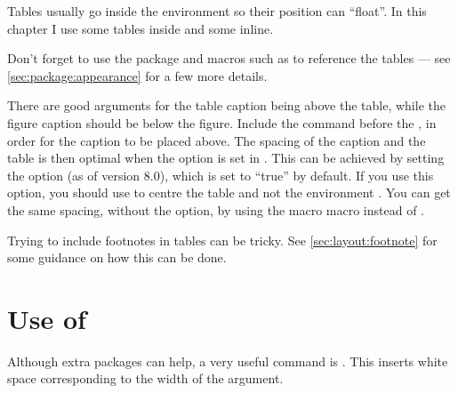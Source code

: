 Tables usually go inside the  environment so their position can \enquote{float}.
In this chapter I use some tables inside  and some inline.

Don't forget to use the package  and macros such as 
to reference the tables --- see \cref{sec:package:appearance} for a few more details.

There are good arguments for the table caption being above the table,
while the figure caption should be below the figure.
Include the  command before the ,
in order for the caption to be placed above.
The spacing of the caption and the table is then optimal
when the option 
is set in \KOMAScript.
This can be achieved by setting the option  (as of version 8.0), which is set to \enquote{true} by default.
If you use this option, you should use  to centre the table
and not the environment .
You can get the same spacing, without the  option,
by using the macro  macro instead of .

Trying to include footnotes in tables can be tricky.
See \cref{sec:layout:footnote} for some guidance on how this can be done.


\section{Use of \texorpdfstring{}{phantom}}%
\label{sec:table:phantom}

Although extra packages can help, a very useful command is
. This inserts white space corresponding to the width
of the argument. 

